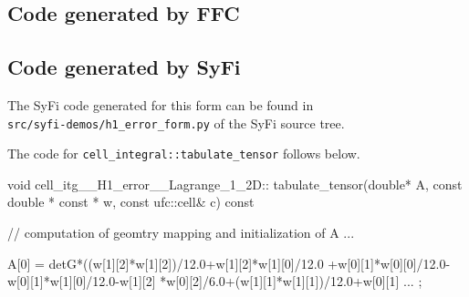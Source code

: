 \subsection{Code generated by FFC}

\subsection{Code generated by SyFi}

The SyFi code generated for this form can be found in \\
\texttt{src/syfi-demos/h1\_error\_form.py} of the SyFi source tree.

The code for \texttt{cell\_integral::tabulate\_tensor} follows below.
\begin{code}
void cell_itg__H1_error__Lagrange_1_2D::
     tabulate_tensor(double* A, const double * const * w,
                     const ufc::cell& c) const
{

  // computation of geomtry mapping and initialization of A ...

  A[0] = detG*((w[1][2]*w[1][2])/12.0+w[1][2]*w[1][0]/12.0
       +w[0][1]*w[0][0]/12.0-w[0][1]*w[1][0]/12.0-w[1][2]
       *w[0][2]/6.0+(w[1][1]*w[1][1])/12.0+w[0][1]  ... ; 
}
\end{code}
